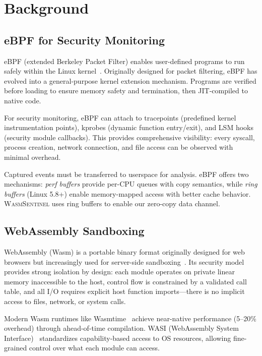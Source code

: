 
\section{Background}
\label{sec:background}

\subsection{eBPF for Security Monitoring}
\label{sec:bg-ebpf}

eBPF (extended Berkeley Packet Filter) enables user-defined programs to run safely within the Linux kernel~\cite{ebpf-intro}.
Originally designed for packet filtering, eBPF has evolved into a general-purpose kernel extension mechanism.
Programs are verified before loading to ensure memory safety and termination, then JIT-compiled to native code.

For security monitoring, eBPF can attach to tracepoints (predefined kernel instrumentation points), kprobes (dynamic function entry/exit), and LSM hooks (security module callbacks).
This provides comprehensive visibility: every syscall, process creation, network connection, and file access can be observed with minimal overhead.

Captured events must be transferred to userspace for analysis.
eBPF offers two mechanisms: \textit{perf buffers} provide per-CPU queues with copy semantics, while \textit{ring buffers} (Linux 5.8+) enable memory-mapped access with better cache behavior.
\textsc{WasmSentinel} uses ring buffers to enable our zero-copy data channel.

\subsection{WebAssembly Sandboxing}
\label{sec:bg-wasm}

WebAssembly (Wasm) is a portable binary format originally designed for web browsers but increasingly used for server-side sandboxing~\cite{wasm-spec}.
Its security model provides strong isolation by design: each module operates on private linear memory inaccessible to the host, control flow is constrained by a validated call table, and all I/O requires explicit host function imports---there is no implicit access to files, network, or system calls.

Modern Wasm runtimes like Wasmtime~\cite{wasmtime} achieve near-native performance (5--20\% overhead) through ahead-of-time compilation.
WASI (WebAssembly System Interface)~\cite{wasi} standardizes capability-based access to OS resources, allowing fine-grained control over what each module can access.

